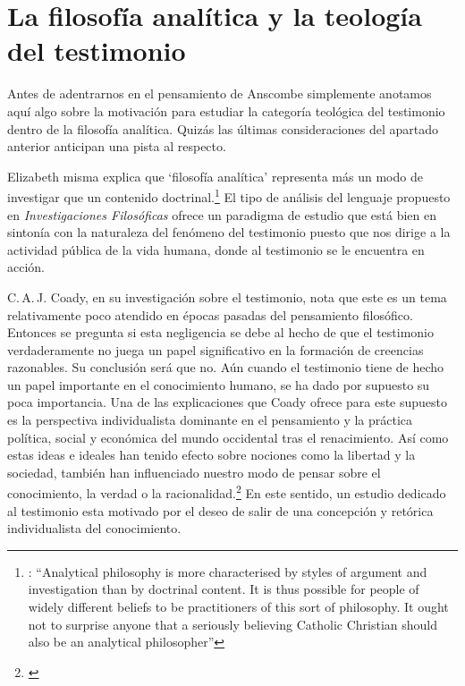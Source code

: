 \section{La filosofía analítica y la teología del testimonio}

Antes de adentrarnos en el pensamiento de Anscombe simplemente anotamos aquí algo sobre la motivación para estudiar la categoría teológica del testimonio dentro de la filosofía analítica. Quizás las últimas consideraciones del apartado anterior anticipan una pista al respecto.

Elizabeth misma explica que `filosofía analítica' representa más un modo de investigar que un contenido doctrinal.\footnote{\cite[66]{anscombe2008faith:twenty}: \enquote{Analytical philosophy is more characterised by styles of argument and investigation than by doctrinal content. It is thus possible for people of widely different beliefs to be practitioners of this sort of philosophy. It ought not to surprise anyone that a seriously believing Catholic Christian should also be an analytical philosopher}} El tipo de análisis del lenguaje propuesto en \emph{Investigaciones Filosóficas} ofrece un paradigma de estudio que está bien en sintonía con la naturaleza del fenómeno del testimonio puesto que nos dirige a la actividad pública de la vida humana, donde al testimonio se le encuentra en acción.

C.\,A.\,J. Coady, en su investigación sobre el testimonio, nota que este es un tema relativamente poco atendido en épocas pasadas del pensamiento filosófico. Entonces se pregunta si esta negligencia se debe al hecho de que el testimonio verdaderamente no juega un papel significativo en la formación de creencias razonables. Su conclusión será que no. Aún cuando el testimonio tiene de hecho un papel importante en el conocimiento humano, se ha dado por supuesto su poca importancia. Una de las explicaciones que Coady ofrece para este supuesto es la perspectiva individualista dominante en el pensamiento y la práctica política, social y económica del mundo occidental tras el renacimiento. Así como estas ideas e ideales han tenido efecto sobre nociones como la libertad y la sociedad, también han influenciado nuestro modo de pensar sobre el conocimiento, la verdad o la racionalidad.\footnote{\cite[Cf.~][6--13]{coady1992test}} En este sentido, un estudio dedicado al testimonio esta motivado por el deseo de salir de una concepción y retórica individualista del conocimiento.

